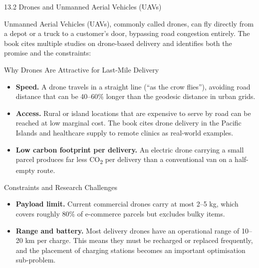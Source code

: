 \documentclass[aspectratio=169,10pt]{beamer}
\begin{document}
\begin{frame}[allowframebreaks]{13.2 Drones and Unmanned Aerial Vehicles (UAVs)}

  Unmanned Aerial Vehicles (UAVs), commonly called drones, can fly
  directly from a depot or a truck to a customer's door, bypassing
  road congestion entirely.  The book cites multiple studies on
  drone-based delivery and identifies both the promise and the
  constraints:

  \bigskip
  \begin{block}{Why Drones Are Attractive for Last-Mile Delivery}
    \begin{itemize}
      \item \textbf{Speed.}
            A drone travels in a straight line (``as the crow flies''),
            avoiding road distance that can be 40--60\% longer than
            the geodesic distance in urban grids.

      \item \textbf{Access.}
            Rural or island locations that are expensive to serve
            by road can be reached at low marginal cost.
            The book cites drone delivery in the Pacific Islands and
            healthcare supply to remote clinics as real-world examples.

      \item \textbf{Low carbon footprint per delivery.}
            An electric drone carrying a small parcel produces far
            less CO\textsubscript{2} per delivery than a conventional
            van on a half-empty route.
    \end{itemize}
  \end{block}

  \bigskip
  \begin{block}{Constraints and Research Challenges}
    \begin{itemize}
      \item \textbf{Payload limit.}
            Current commercial drones carry at most 2--5 kg,
            which covers roughly 80\% of e-commerce parcels
            but excludes bulky items.

      \item \textbf{Range and battery.}
            Most delivery drones have an operational range of
            10--20 km per charge.  This means they must be
            recharged or replaced frequently, and the placement
            of charging stations becomes an important optimisation
            sub-problem.


\end{itemize}
\end{block}
\end{frame}
\end{document}
